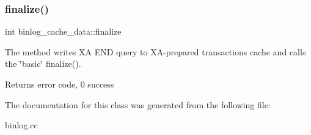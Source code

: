\subsubsection{\texorpdfstring{finalize()}{finalize()}\hspace{0.1cm}{\footnotesize\ttfamily [2/2]}}
{\footnotesize\ttfamily int binlog\+\_\+cache\+\_\+data\+::finalize}

The method writes XA E\+ND query to XA-\/prepared transaction\textquotesingle{}s cache and calls the \char`\"{}basic\char`\"{} finalize().

\begin{DoxyReturn}{Returns}
error code, 0 success 
\end{DoxyReturn}


The documentation for this class was generated from the following file\+:\begin{DoxyCompactItemize}
\item 
binlog.\+cc\end{DoxyCompactItemize}
